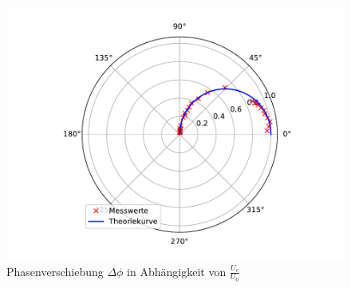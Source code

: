 \begin{figure}
  \centering
  \includegraphics[scale = 0.7]{polar2.pdf}
  \caption{Phasenverschiebung $\Delta\phi $ in Abhängigkeit von $\frac{U_c}{U_0} $}
  \label{polar}
\end{figure}

